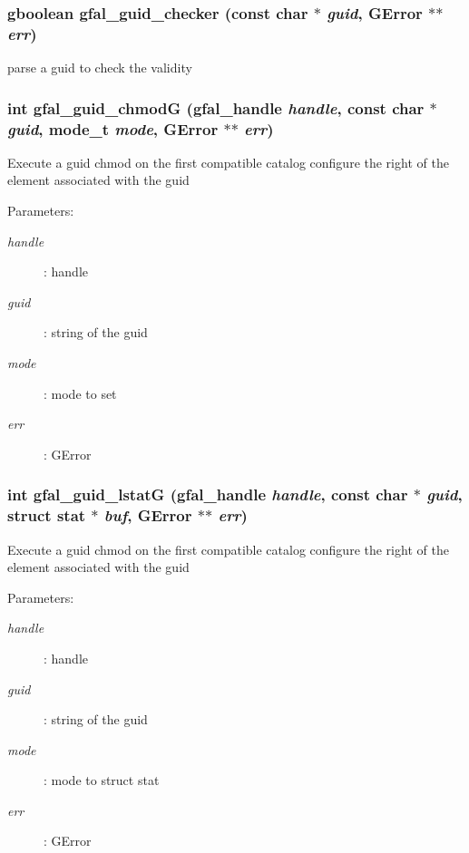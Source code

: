 \subsubsection{\setlength{\rightskip}{0pt plus 5cm}gboolean gfal\_\-guid\_\-checker (const char $\ast$ {\em guid}, GError $\ast$$\ast$ {\em err})}\label{gfal__common__guid_8c_9e4b6149b0256f725bc1dab5fc32ab62}


parse a guid to check the validity 
\subsubsection{\setlength{\rightskip}{0pt plus 5cm}int gfal\_\-guid\_\-chmod\-G (gfal\_\-handle {\em handle}, const char $\ast$ {\em guid}, mode\_\-t {\em mode}, GError $\ast$$\ast$ {\em err})}\label{gfal__common__guid_8c_34d01b3a64910eddc1d7988c6b1b2ae4}


Execute a guid chmod on the first compatible catalog configure the right of the element associated with the guid \begin{Desc}
\item[Parameters:]
\begin{description}
\item[{\em handle}]: handle \item[{\em guid}]: string of the guid \item[{\em mode}]: mode to set \item[{\em err}]: GError \end{description}
\end{Desc}
\subsubsection{\setlength{\rightskip}{0pt plus 5cm}int gfal\_\-guid\_\-lstat\-G (gfal\_\-handle {\em handle}, const char $\ast$ {\em guid}, struct stat $\ast$ {\em buf}, GError $\ast$$\ast$ {\em err})}\label{gfal__common__guid_8c_c36e690e0d3acbd553d9466fa14dcff4}


Execute a guid chmod on the first compatible catalog configure the right of the element associated with the guid \begin{Desc}
\item[Parameters:]
\begin{description}
\item[{\em handle}]: handle \item[{\em guid}]: string of the guid \item[{\em mode}]: mode to struct stat \item[{\em err}]: GError \end{description}
\end{Desc}
